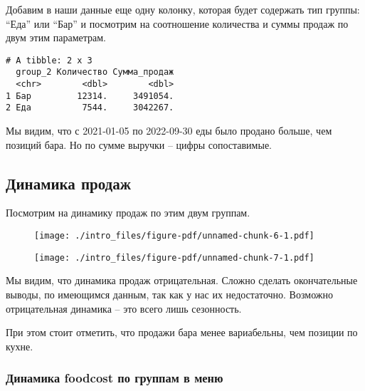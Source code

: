 \documentclass[
  letterpaper,
  DIV=11,
  numbers=noendperiod]{scrreport}
\begin{document}
Добавим в наши данные еще одну колонку, которая будет содержать тип
группы: ``Еда'' или ``Бар'' и посмотрим на соотношение количества и
суммы продаж по двум этим параметрам.

\begin{verbatim}
# A tibble: 2 x 3
  group_2 Количество Сумма_продаж
  <chr>        <dbl>        <dbl>
1 Бар         12314.     3491054.
2 Еда          7544.     3042267.
\end{verbatim}

Мы видим, что с 2021-01-05 по 2022-09-30 еды было продано больше, чем
позиций бара. Но по сумме выручки -- цифры сопоставимые.

\hypertarget{ux434ux438ux43dux430ux43cux438ux43aux430-ux43fux440ux43eux434ux430ux436}{%
\subsection*{Динамика
продаж}\label{ux434ux438ux43dux430ux43cux438ux43aux430-ux43fux440ux43eux434ux430ux436}}

Посмотрим на динамику продаж по этим двум группам.

\begin{figure}

{\centering \texttt{[image: ./intro\_files/figure-pdf/unnamed-chunk-6-1.pdf]}

}

\end{figure}

\begin{figure}

{\centering \texttt{[image: ./intro\_files/figure-pdf/unnamed-chunk-7-1.pdf]}

}

\end{figure}

Мы видим, что динамика продаж отрицательная. Сложно сделать
окончательные выводы, по имеющимся данным, так как у нас их
недостаточно. Возможно отрицательная динамика -- это всего лишь
сезонность.

При этом стоит отметить, что продажи бара менее вариабельны, чем позиции
по кухне.

\hypertarget{ux434ux438ux43dux430ux43cux438ux43aux430-foodcost-ux43fux43e-ux433ux440ux443ux43fux43fux430ux43c-ux432-ux43cux435ux43dux44e}{%
\subsubsection*{Динамика foodcost по группам в
меню}\label{ux434ux438ux43dux430ux43cux438ux43aux430-foodcost-ux43fux43e-ux433ux440ux443ux43fux43fux430ux43c-ux432-ux43cux435ux43dux44e}}
\end{document}
